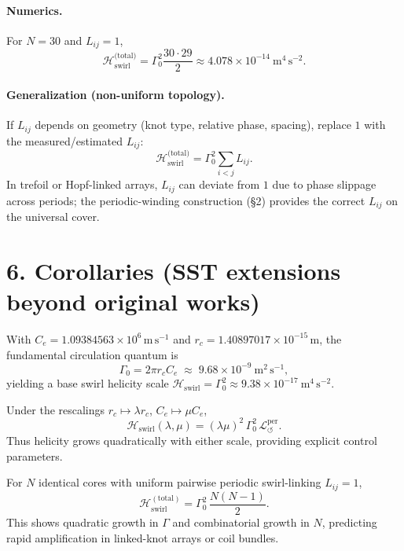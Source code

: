 \documentclass[11pt]{article}
\begin{document}
\paragraph{Numerics.}
    For $N=30$ and $L_{ij}=1$,
    \[
        \mathcal{H}_{\text{swirl}}^{\text{(total)}}
        = \Gamma_0^2 \frac{30\cdot29}{2}
        \approx 4.078 \times 10^{-14}\ \mathrm{m^4\,s^{-2}}.
    \]

\paragraph{Generalization (non-uniform topology).}
    If $L_{ij}$ depends on geometry (knot type, relative phase, spacing), replace $1$ with the measured/estimated $L_{ij}$:
    \[
        \mathcal{H}_{\text{swirl}}^{\text{(total)}}
        = \Gamma_0^2 \sum_{i<j} L_{ij}.
    \]
    In trefoil or Hopf-linked arrays, $L_{ij}$ can deviate from $1$ due to phase slippage across periods; the periodic-winding construction (§2) provides the correct $L_{ij}$ on the universal cover.


\section*{6. Corollaries (SST extensions beyond original works)}

\begin{corollary}
With $C_e=1.09384563\times 10^6\,\mathrm{m\,s^{-1}}$ and $r_c=1.40897017\times 10^{-15}\,\mathrm{m}$,
the fundamental circulation quantum is
\[
    \Gamma_0 = 2\pi r_c C_e \;\approx\; 9.68\times10^{-9}\ \mathrm{m^2\,s^{-1}},
\]
yielding a base swirl helicity scale
\(\mathcal{H}_{\text{swirl}} = \Gamma_0^2 \approx 9.38\times10^{-17}\ \mathrm{m^4\,s^{-2}}\).
\end{corollary}

\begin{corollary}
Under the rescalings $r_c\mapsto \lambda r_c$, $C_e\mapsto \mu C_e$,
\[
    \mathcal{H}_{\text{swirl}}(\lambda,\mu) = (\lambda\mu)^2\,\Gamma_0^2\,
    \mathcal{L}_{\circlearrowleft}^{\mathrm{per}}.
\]
Thus helicity grows quadratically with either scale, providing explicit control parameters.
\end{corollary}

\begin{corollary}
For $N$ identical cores with uniform pairwise periodic swirl-linking $L_{ij}=1$,
\[
    \mathcal{H}_{\text{swirl}}^{\mathrm{(total)}}
    = \Gamma_0^2\,\frac{N(N-1)}{2}.
\]
This shows quadratic growth in $\Gamma$ and combinatorial growth in $N$, predicting rapid amplification in linked-knot arrays or coil bundles.
\end{corollary}
\end{document}
